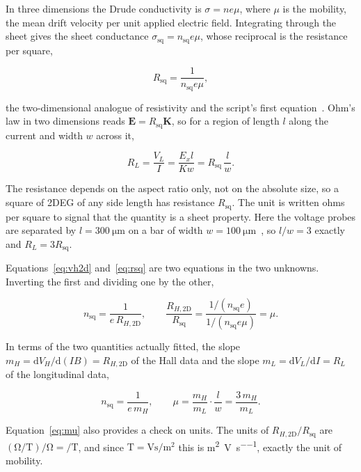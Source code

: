 \documentclass[11pt,a4paper]{article}
\newcommand{\Rsq}{R_{\mathrm{sq}}}
\newcommand{\Rhtwod}{R_{H,\mathrm{2D}}}
\newcommand{\nsq}{n_{\mathrm{sq}}}
\begin{document}
In three dimensions the Drude conductivity is $\sigma = ne\mu$, where $\mu$ is the mobility,
the mean drift velocity per unit applied electric field. Integrating through the sheet gives
the sheet conductance $\sigma_{\mathrm{sq}} = \nsq e \mu$, whose reciprocal is the resistance
per square,

\begin{equation}
\Rsq = \frac{1}{\nsq e \mu},
\label{eq:rsq}
\end{equation}

the two-dimensional analogue of resistivity and the script's first equation~\cite{script}.
Ohm's law in two dimensions reads $\mathbf{E} = \Rsq\mathbf{K}$, so for a region of length
$l$ along the current and width $w$ across it,

\begin{equation}
R_L = \frac{V_L}{I} = \frac{E_x l}{K w} = \Rsq\,\frac{l}{w}.
\label{eq:rl}
\end{equation}

The resistance depends on the aspect ratio only, not on the absolute size, so a square of
2DEG of any side length has resistance $\Rsq$. The unit is written ohms per square to signal
that the quantity is a sheet property. Here the voltage probes are separated by
$l = \qty{300}{\micro\metre}$ on a bar of width $w = \qty{100}{\micro\metre}$~\cite{script},
so $l/w = 3$ exactly and $R_L = 3\Rsq$.

Equations~\eqref{eq:vh2d} and~\eqref{eq:rsq} are two equations in the two unknowns. Inverting
the first and dividing one by the other,

\begin{equation}
\nsq = \frac{1}{e\,\Rhtwod},
\qquad
\frac{\Rhtwod}{\Rsq} = \frac{1/(\nsq e)}{1/(\nsq e \mu)} = \mu .
\label{eq:mu}
\end{equation}

In terms of the two quantities actually fitted, the slope $m_H = \mathrm{d}V_H/\mathrm{d}(IB)
= \Rhtwod$ of the Hall data and the slope $m_L = \mathrm{d}V_L/\mathrm{d}I = R_L$ of the
longitudinal data,

\begin{equation}
\nsq = \frac{1}{e\,m_H}, \qquad
\mu = \frac{m_H}{m_L}\cdot\frac{l}{w} = \frac{3\,m_H}{m_L}.
\label{eq:working}
\end{equation}

Equation~\eqref{eq:mu} also provides a check on units. The units of $\Rhtwod/\Rsq$ are
$(\unit{\ohm\per\tesla})/\unit{\ohm} = \unit{\per\tesla}$, and since
$\unit{\tesla}=\unit{\volt\second\per\metre\squared}$ this is
\unit{\metre\squared\per\volt\per\second}, exactly the unit of mobility.
\end{document}
